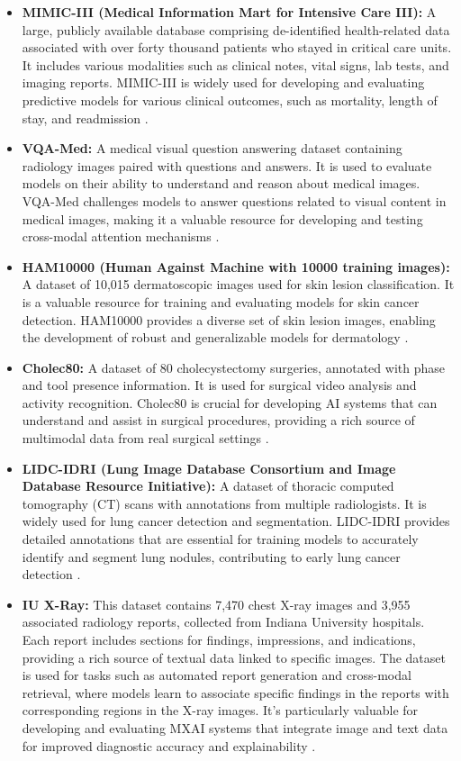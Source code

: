 \documentclass[pdflatex,sn-mathphys-num]{sn-jnl}%
\theoremstyle{thmstyleone}%
\theoremstyle{thmstyletwo}%
\theoremstyle{thmstylethree}%
\begin{document}
\begin{itemize}
\begin{itemize}
    \item \textbf{MIMIC-III (Medical Information Mart for Intensive Care III):} A large, publicly available database comprising de-identified health-related data associated with over forty thousand patients who stayed in critical care units. It includes various modalities such as clinical notes, vital signs, lab tests, and imaging reports. MIMIC-III is widely used for developing and evaluating predictive models for various clinical outcomes, such as mortality, length of stay, and readmission \cite{johnson2016mimic}.
    \item \textbf{VQA-Med:} A medical visual question answering dataset containing radiology images paired with questions and answers. It is used to evaluate models on their ability to understand and reason about medical images. VQA-Med challenges models to answer questions related to visual content in medical images, making it a valuable resource for developing and testing cross-modal attention mechanisms \cite{abacha2019vqa}.
    \item \textbf{HAM10000 (Human Against Machine with 10000 training images):} A dataset of 10,015 dermatoscopic images used for skin lesion classification. It is a valuable resource for training and evaluating models for skin cancer detection. HAM10000 provides a diverse set of skin lesion images, enabling the development of robust and generalizable models for dermatology \cite{Tschandl_2018}.
    \item \textbf{Cholec80:} A dataset of 80 cholecystectomy surgeries, annotated with phase and tool presence information. It is used for surgical video analysis and activity recognition. Cholec80 is crucial for developing AI systems that can understand and assist in surgical procedures, providing a rich source of multimodal data from real surgical settings \cite{twinanda2016endonetdeeparchitecturerecognition}.
    \item \textbf{LIDC-IDRI (Lung Image Database Consortium and Image Database Resource Initiative):} A dataset of thoracic computed tomography (CT) scans with annotations from multiple radiologists. It is widely used for lung cancer detection and segmentation. LIDC-IDRI provides detailed annotations that are essential for training models to accurately identify and segment lung nodules, contributing to early lung cancer detection \cite{armato2011lung}.
    \item \textbf{IU X-Ray:} This dataset contains 7,470 chest X-ray images and 3,955 associated radiology reports, collected from Indiana University hospitals. Each report includes sections for findings, impressions, and indications, providing a rich source of textual data linked to specific images. The dataset is used for tasks such as automated report generation and cross-modal retrieval, where models learn to associate specific findings in the reports with corresponding regions in the X-ray images. It's particularly valuable for developing and evaluating MXAI systems that integrate image and text data for improved diagnostic accuracy and explainability \cite{demner2016preparing}.

\end{itemize}
\end{itemize}
\end{document}
